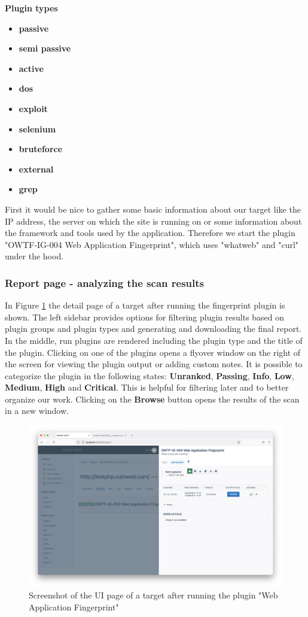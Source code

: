 \textbf{Plugin types}

\begin{itemize}
	\item \textbf{passive}
	\item \textbf{semi passive}
	\item \textbf{active}
	\item \textbf{dos}
	\item \textbf{exploit}
	\item \textbf{selenium}
	\item \textbf{bruteforce}
	\item \textbf{external}
	\item \textbf{grep}
\end{itemize}

First it would be nice to gather some basic information about our target like the IP address, the server on which the site is running on or some information about the framework and tools used by the application. Therefore we start the plugin "OWTF-IG-004 Web Application Fingerprint", which uses "whatweb" and "curl" under the hood.

\subsubsection{Report page - analyzing the scan results}

In Figure \ref{fig:ui3} the detail page of a target after running the fingerprint plugin is shown. The left sidebar provides options for filtering plugin results based on plugin groups and plugin types and generating and downloading the final report. In the middle, run plugins are rendered including the plugin type and the title of the plugin. Clicking on one of the plugins opens a flyover window on the right of the screen for viewing the plugin output or adding custom notes. It is possible to categorize the plugin in the following states: \textbf{Unranked}, \textbf{Passing}, \textbf{Info}, \textbf{Low}, \textbf{Medium}, \textbf{High} and \textbf{Critical}. This is helpful for filtering later and to better organize our work. Clicking on the \textbf{Browse} button opens the results of the scan in a new window.

\begin{figure}[H]
	\centering
	\includegraphics[width=12cm,keepaspectratio=true]{pictures/ui3.png}
	\caption{
		Screenshot of the UI page of a target after running the plugin "Web Application Fingerprint"
	}
	\label{fig:ui3}
\end{figure}

